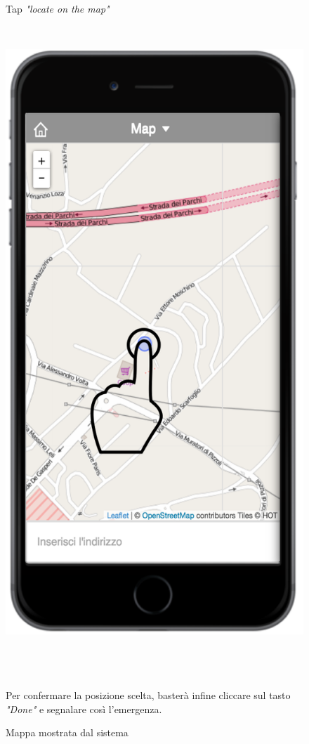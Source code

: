\begin{figure}
\begin{minipage}[b]{6cm}
	\caption{Tap \textit{"locate on the map"} }
	\label{fig:sceltamappa}
 \end{minipage}
 \ \hspace{6 mm} \hspace{7 mm} \
 \begin{minipage}[b]{6cm}
\includegraphics[scale=0.6]{interfaccia/mappasegnala.png}
	\caption{Mappa mostrata dal sistema }
	\label{fig:mappa-segnala}
	
 \end{minipage}
 \\ \\ \\
Per confermare la posizione scelta, basterà infine cliccare sul tasto \textit{"Done"} e segnalare così l'emergenza. 
\end{figure}



